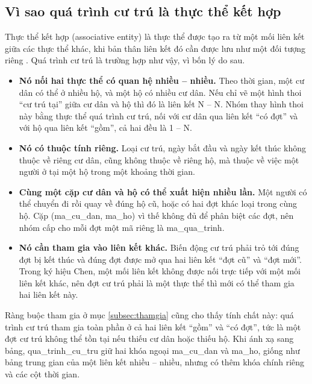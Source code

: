 \subsection{Vì sao quá trình cư trú là thực thể kết hợp}
\label{subsec:thuckethop}

Thực thể kết hợp (associative entity) là thực thể được tạo ra từ một mối liên kết giữa các thực thể khác, khi bản thân liên kết đó cần được lưu như một đối tượng riêng \cite{elmasri}. Quá trình cư trú là trường hợp như vậy, vì bốn lý do sau.

\begin{itemize}
    \item \textbf{Nó nối hai thực thể có quan hệ nhiều -- nhiều.} Theo thời gian, một cư dân có thể ở nhiều hộ, và một hộ có nhiều cư dân. Nếu chỉ vẽ một hình thoi ``cư trú tại'' giữa cư dân và hộ thì đó là liên kết N -- N. Nhóm thay hình thoi này bằng thực thể quá trình cư trú, nối với cư dân qua liên kết ``có đợt'' và với hộ qua liên kết ``gồm'', cả hai đều là 1 -- N.
    \item \textbf{Nó có thuộc tính riêng.} Loại cư trú, ngày bắt đầu và ngày kết thúc không thuộc về riêng cư dân, cũng không thuộc về riêng hộ, mà thuộc về việc một người ở tại một hộ trong một khoảng thời gian.
    \item \textbf{Cùng một cặp cư dân và hộ có thể xuất hiện nhiều lần.} Một người có thể chuyển đi rồi quay về đúng hộ cũ, hoặc có hai đợt khác loại trong cùng hộ. Cặp (ma\_cu\_dan, ma\_ho) vì thế không đủ để phân biệt các đợt, nên nhóm cấp cho mỗi đợt một mã riêng là ma\_qua\_trinh.
    \item \textbf{Nó cần tham gia vào liên kết khác.} Biến động cư trú phải trỏ tới đúng đợt bị kết thúc và đúng đợt được mở qua hai liên kết ``đợt cũ'' và ``đợt mới''. Trong ký hiệu Chen, một mối liên kết không được nối trực tiếp với một mối liên kết khác, nên đợt cư trú phải là một thực thể thì mới có thể tham gia hai liên kết này.
\end{itemize}

Ràng buộc tham gia ở mục \ref{subsec:thamgia} cũng cho thấy tính chất này: quá trình cư trú tham gia toàn phần ở cả hai liên kết ``gồm'' và ``có đợt'', tức là một đợt cư trú không thể tồn tại nếu thiếu cư dân hoặc thiếu hộ. Khi ánh xạ sang bảng, qua\_trinh\_cu\_tru giữ hai khóa ngoại ma\_cu\_dan và ma\_ho, giống như bảng trung gian của một liên kết nhiều -- nhiều, nhưng có thêm khóa chính riêng và các cột thời gian.
